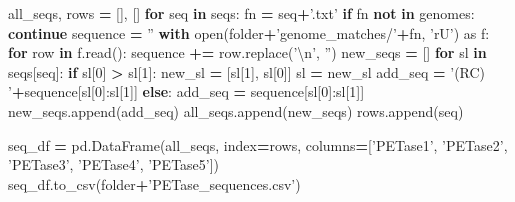 \documentclass[
]{article}
\newenvironment{Shaded}{\begin{snugshade}}{\end{snugshade}}
\newcommand{\BuiltInTok}[1]{#1}
\newcommand{\CharTok}[1]{\textcolor[rgb]{0.31,0.60,0.02}{#1}}
\newcommand{\ControlFlowTok}[1]{\textcolor[rgb]{0.13,0.29,0.53}{\textbf{#1}}}
\newcommand{\DecValTok}[1]{\textcolor[rgb]{0.00,0.00,0.81}{#1}}
\newcommand{\ImportTok}[1]{#1}
\newcommand{\KeywordTok}[1]{\textcolor[rgb]{0.13,0.29,0.53}{\textbf{#1}}}
\newcommand{\NormalTok}[1]{#1}
\newcommand{\OperatorTok}[1]{\textcolor[rgb]{0.81,0.36,0.00}{\textbf{#1}}}
\newcommand{\StringTok}[1]{\textcolor[rgb]{0.31,0.60,0.02}{#1}}
\begin{document}
\begin{Shaded}
\begin{Highlighting}[]
\NormalTok{all_seqs, rows }\OperatorTok{=}\NormalTok{ [], []}
\ControlFlowTok{for}\NormalTok{ seq }\KeywordTok{in}\NormalTok{ seqs:}
\NormalTok{  fn }\OperatorTok{=}\NormalTok{ seq}\OperatorTok{+}\StringTok{'.txt'}
  \ControlFlowTok{if}\NormalTok{ fn }\KeywordTok{not} \KeywordTok{in}\NormalTok{ genomes: }\ControlFlowTok{continue}
\NormalTok{  sequence }\OperatorTok{=} \StringTok{''}
  \ControlFlowTok{with} \BuiltInTok{open}\NormalTok{(folder}\OperatorTok{+}\StringTok{'genome_matches/'}\OperatorTok{+}\NormalTok{fn, }\StringTok{'rU'}\NormalTok{) }\ImportTok{as}\NormalTok{ f:}
    \ControlFlowTok{for}\NormalTok{ row }\KeywordTok{in}\NormalTok{ f.read():}
\NormalTok{      sequence }\OperatorTok{+=}\NormalTok{ row.replace(}\StringTok{'}\CharTok{\textbackslash{}n}\StringTok{'}\NormalTok{, }\StringTok{''}\NormalTok{)}
\NormalTok{  new_seqs }\OperatorTok{=}\NormalTok{ []}
  \ControlFlowTok{for}\NormalTok{ sl }\KeywordTok{in}\NormalTok{ seqs[seq]:}
    \ControlFlowTok{if}\NormalTok{ sl[}\DecValTok{0}\NormalTok{] }\OperatorTok{>}\NormalTok{ sl[}\DecValTok{1}\NormalTok{]:}
\NormalTok{      new_sl }\OperatorTok{=}\NormalTok{ [sl[}\DecValTok{1}\NormalTok{], sl[}\DecValTok{0}\NormalTok{]]}
\NormalTok{      sl }\OperatorTok{=}\NormalTok{ new_sl}
\NormalTok{      add_seq }\OperatorTok{=} \StringTok{'(RC) '}\OperatorTok{+}\NormalTok{sequence[sl[}\DecValTok{0}\NormalTok{]:sl[}\DecValTok{1}\NormalTok{]]}
    \ControlFlowTok{else}\NormalTok{:}
\NormalTok{      add_seq }\OperatorTok{=}\NormalTok{ sequence[sl[}\DecValTok{0}\NormalTok{]:sl[}\DecValTok{1}\NormalTok{]]}
\NormalTok{    new_seqs.append(add_seq)}
\NormalTok{  all_seqs.append(new_seqs)}
\NormalTok{  rows.append(seq)}

\NormalTok{seq_df }\OperatorTok{=}\NormalTok{ pd.DataFrame(all_seqs, index}\OperatorTok{=}\NormalTok{rows, columns}\OperatorTok{=}\NormalTok{[}\StringTok{'PETase1'}\NormalTok{, }\StringTok{'PETase2'}\NormalTok{, }\StringTok{'PETase3'}\NormalTok{, }\StringTok{'PETase4'}\NormalTok{, }\StringTok{'PETase5'}\NormalTok{])}
\NormalTok{seq_df.to_csv(folder}\OperatorTok{+}\StringTok{'PETase_sequences.csv'}\NormalTok{)}
\end{Highlighting}
\end{Shaded}
\end{document}
